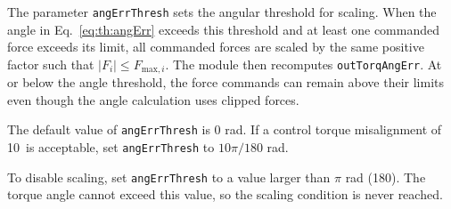 The parameter {\tt angErrThresh} sets the angular threshold for scaling.  When the angle in Eq.~\eqref{eq:th:angErr} exceeds this threshold and at least one commanded force exceeds its limit, all commanded forces are scaled by the same positive factor such that $|F_i| \le F_{\text{max},i}$.  The module then recomputes {\tt outTorqAngErr}.  At or below the angle threshold, the force commands can remain above their limits even though the angle calculation uses clipped forces.

The default value of {\tt angErrThresh} is 0 rad.  If a control torque misalignment of 10\dg\ is acceptable, set {\tt angErrThresh} to $10\pi/180$ rad.

To disable scaling, set {\tt angErrThresh} to a value larger than $\pi$ rad (180\dg).  The torque angle cannot exceed this value, so the scaling condition is never reached.
